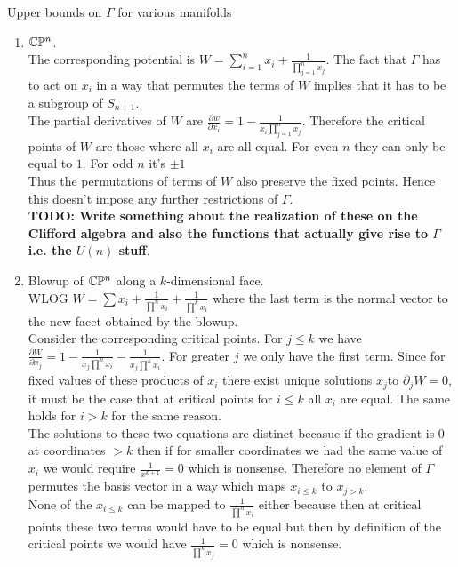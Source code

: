 \documentclass[a4paper]{article}
\begin{document}
Upper bounds on $\Gamma$ for various manifolds
\begin{enumerate}
    \item $\mathbb{C}\mathbb{P}^{n}$.\\ The corresponding potential is $W=\sum_{i=1}^{n} x_{i} + \frac{1}{\prod_{j=1}^{n} x_{j} }$. The fact that $\Gamma$ has to act on $x_{i}$ in a way that permutes the terms of $W$ implies that it has to be a subgroup of $S_{n+1}$.\\
        The partial derivatives of $W$ are $\frac{\partial w}{\partial x_{i}} =1-\frac{1}{x_{i}\prod_{j=1}^{n}x_{j}}$. Therefore the critical points of $W$ are those where all  $x_{i}$ are all equal. For even $n$ they can only be equal to $1$. For odd $n$ it's $\pm 1$\\
        Thus the permutations of terms of $W$ also preserve the fixed points. Hence this doesn't impose any further restrictions of $\Gamma$.\\
        \textbf{TODO: Write something about the realization of these on the Clifford algebra and also the functions that actually give rise to $\Gamma$ i.e. the $U(n)$ stuff}.\\
    \item Blowup of $\mathbb{C}\mathbb{P}^{n}$ along a $k$-dimensional face.\\
        WLOG $W=\sum x_{i}+\frac{1}{\prod ^n x_{i}}+\frac{1}{\prod ^k x_{i}}$ where the last term is the normal vector to the new facet obtained by the blowup.\\
        Consider the corresponding critical points. For $j\le k$ we have $\frac{\partial W}{\partial x_{j}} =1-\frac{1}{x_{j}\prod^n x_{i}} - \frac{1}{x_{j}\prod^k x_{i}}$. For greater $j$ we only have the first term.
        Since for fixed values of these products of $x_{i}$ there exist unique solutions $x_{j}$to $\partial_j W=0$, it must be the case that at critical points for $i\le k$ all $x_{i}$     are equal. The same holds for $i>k$ for the same reason. \\
        The solutions to these two equations are distinct becasue if the gradient is 0 at coordinates $>  k$ then if for smaller coordinates we had the same value of  $x_{i}$ we would require $\frac{1}{x^{k+1}}=0$ which is nonsense. Therefore  no element of $\Gamma $ permutes the basis vector in a way which maps $x_{i\le k}$ to $x_{j>k}$.\\
        None of the $x_{i\le k}$ can be mapped to $\frac{1}{\prod^n x_{i}}$ either because then at critical points these two terms would have to be equal but then by definition of the critical points we would have $\frac{1}{\prod^{k}x_{j}}=0$ which is nonsense.\\

\end{enumerate}
\end{document}
